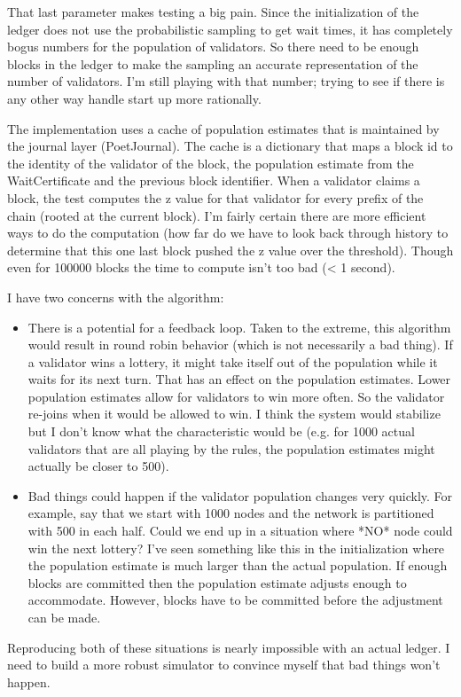 That last parameter makes testing a big pain. Since the initialization
of the ledger does not use the probabilistic sampling to get wait times,
it has completely bogus numbers for the population of validators. So
there need to be enough blocks in the ledger to make the sampling an
accurate representation of the number of validators. I'm still playing
with that number; trying to see if there is any other way handle start
up more rationally.

The implementation uses a cache of population estimates that is
maintained by the journal layer (PoetJournal). The cache is a dictionary
that maps a block id to the identity of the validator of the block, the
population estimate from the WaitCertificate and the previous block
identifier. When a validator claims a block, the test computes the z
value for that validator for every prefix of the chain (rooted at the
current block). I'm fairly certain there are more efficient ways to do
the computation (how far do we have to look back through history to
determine that this one last block pushed the z value over the
threshold). Though even for 100000 blocks the time to compute isn't too
bad (< 1 second).

I have two concerns with the algorithm:
\begin{itemize}
\item There is a potential for a feedback loop. Taken to the extreme,
  this algorithm would result in round robin behavior (which is not
  necessarily a bad thing). If a validator wins a lottery, it might take
  itself out of the population while it waits for its next turn. That
  has an effect on the population estimates. Lower population estimates
  allow for validators to win more often. So the validator re-joins when
  it would be allowed to win. I think the system would stabilize but I
  don't know what the characteristic would be (e.g. for 1000 actual
  validators that are all playing by the rules, the population estimates
  might actually be closer to 500).

\item Bad things could happen if the validator population changes very
  quickly. For example, say that we start with 1000 nodes and the
  network is partitioned with 500 in each half. Could we end up in a
  situation where *NO* node could win the next lottery? I've seen
  something like this in the initialization where the population
  estimate is much larger than the actual population. If enough blocks
  are committed then the population estimate adjusts enough to
  accommodate. However, blocks have to be committed before the
  adjustment can be made.
\end{itemize}

Reproducing both of these situations is nearly impossible with an actual
ledger. I need to build a more robust simulator to convince myself that
bad things won't happen.

